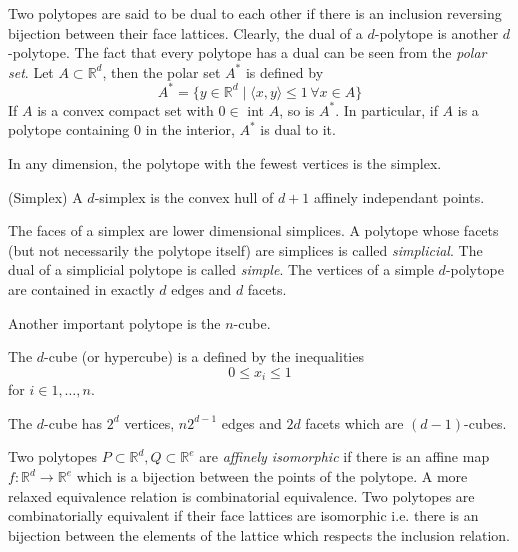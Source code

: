 
Two polytopes are said to be dual to each other if there is an inclusion 
reversing bijection between their face lattices. Clearly, the dual of a 
$d$-polytope is another $d$-polytope. The fact that every polytope has a dual 
can be seen from the \textit{polar set}. Let $A\subset \mathbb{R}^d$, then the 
polar set $A^*$ is defined by
\begin{equation}
 A^* = \{y \in \mathbb{R}^d \mid \langle x,y\rangle \leq 1 \, \forall  x  \in A 
\} 
\end{equation}
If $A$ is a convex compact set with $0 \in$ int $A$, so is $A^*$. In 
particular, if $A$ is a polytope containing $0$ in the interior, $A^*$ is dual 
to it. 

In any dimension, the polytope with the fewest vertices is the simplex. 
\begin{definition}
 (Simplex) A $d$-simplex is the convex hull of $d+1$ affinely independant 
points.
\end{definition}
The faces of a simplex are lower dimensional simplices. A polytope whose facets 
(but not necessarily the polytope itself) are simplices is called 
\textit{simplicial}. The dual of a simplicial polytope is called 
\textit{simple}. The vertices of a simple $d$-polytope are contained in exactly 
$d$ edges and $d$ facets. 

Another important polytope is the $n$-cube.

\begin{definition}
 The $d$-cube (or hypercube) is a defined by the inequalities
\begin{equation}
 0 \leq x_i \leq 1 
\end{equation}
for $i \in 1,\dots, n$.
\end{definition}
The $d$-cube has $2^d$ vertices, $n2^{d-1}$ edges and $2d$ facets which
are $(d-1)$-cubes.

Two polytopes $P\subset \mathbb{R}^d, Q \subset \mathbb{R}^e$ are 
\textit{affinely isomorphic} if there is an affine map $f: \mathbb{R}^d 
\rightarrow \mathbb{R}^e$ which is a bijection between the points of the 
polytope. A more relaxed equivalence relation is combinatorial equivalence. Two 
polytopes are combinatorially equivalent if their face lattices are isomorphic 
i.e. there is an bijection between the elements of the lattice which respects 
the inclusion relation. 

